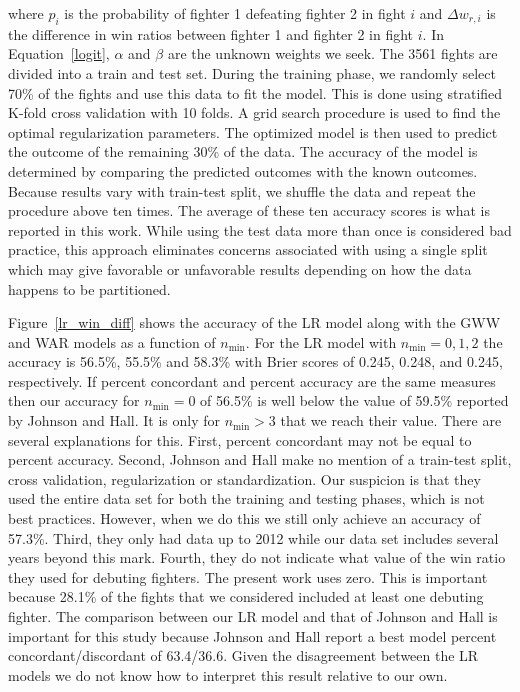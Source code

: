 \noindent
where $p_i$ is the probability of fighter 1 defeating fighter 2 in fight $i$ and
$\Delta w_{r,i}$ is the difference in win ratios between fighter 1 and fighter 2 in fight $i$.
In Equation~\ref{logit}, $\alpha$ and $\beta$ are the unknown weights we seek.
The 3561 fights are divided into a train and test set.
During the training phase, we randomly select 70\% of the fights
and use this data to fit the model. This is done using
stratified K-fold cross validation with 10 folds. A grid search
procedure is used to find the optimal regularization parameters.
The optimized model is then used to predict the outcome
of the remaining 30\% of the data. The accuracy of the model is determined
by comparing the predicted outcomes with the known outcomes.
Because results vary with train-test split, we shuffle the
data and repeat the procedure above ten times. The average
of these ten accuracy scores is what is reported in this work.
While using the
test data more than once is considered bad practice, this approach eliminates
concerns associated with using a single split which may give
favorable or unfavorable results depending on how the data
happens to be partitioned.

Figure~\ref{lr_win_diff} shows the accuracy of the LR model along with
the GWW and WAR models
as a function of $n_{\textrm{min}}$. For the LR model with $n_{\textrm{min}}=0,1,2$ the accuracy
is 56.5\%, 55.5\% and 58.3\% with Brier scores of 0.245, 0.248, and 0.245, respectively.
If percent concordant and percent accuracy are the same measures then
our accuracy for $n_{\textrm{min}}=0$ of 56.5\% is
well below the value of 59.5\% reported by Johnson and Hall. It is only
for $n_{\textrm{min}}>3$ that we reach their value.
There are several explanations for this. First, percent
concordant may not be equal to percent accuracy. Second, Johnson and Hall
make no mention of a train-test split, cross validation, regularization
or standardization.
Our suspicion is that they used the entire data set for
both the training and testing phases, which is not best practices.
However, when we do this
we still only achieve an accuracy of 57.3\%.
Third, they only had data up to 2012 while our data set includes
several years beyond this mark. Fourth,
they do not indicate what value of the
win ratio they used for debuting fighters.
The present work uses zero.
This is important because 28.1\% of the
fights that we considered included at least one debuting fighter.
The comparison between our LR model and that
of Johnson and Hall is important for this study
because Johnson and Hall report a best model percent concordant/discordant
of 63.4/36.6. Given the disagreement between
the LR models we do not know how to interpret this result relative
to our own.

